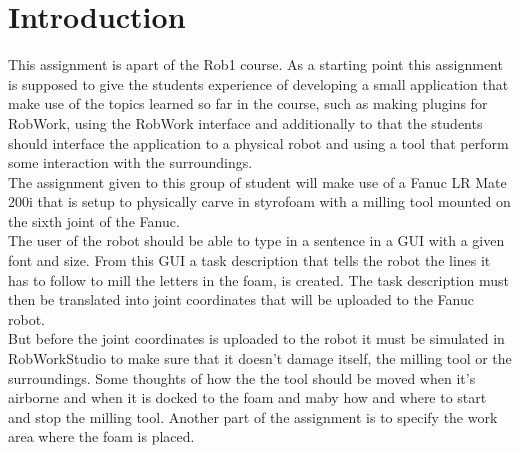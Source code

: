 \section{Introduction}
\label{sec:intro}

This assignment is apart of the Rob1 course. As a starting point this assignment is supposed to give the students experience of developing a small application that make use of the topics learned so far in the course, such as making plugins for RobWork, using the RobWork interface and additionally to that the students should interface the application to a physical robot and using a tool that perform some interaction with the surroundings.
\\The assignment given to this group of student will make use of a Fanuc LR Mate 200i that is setup to physically carve in styrofoam with a milling tool mounted on the sixth joint of the Fanuc.
\\The user of the robot should be able to type in a sentence in a GUI with a given font and size. From this GUI a task description that tells the robot the lines it has to follow to mill the letters in the foam, is created. The task description must then be translated into joint coordinates that will be uploaded to the Fanuc robot.
\\But before the joint coordinates is uploaded to the robot it must be simulated in RobWorkStudio to make sure that it doesn't damage itself, the milling tool or the surroundings. Some thoughts of how the the tool should be moved when it's airborne and when it is docked to the foam and maby how and where to start and stop the milling tool. Another part of the assignment is to specify the work area where the foam is placed.